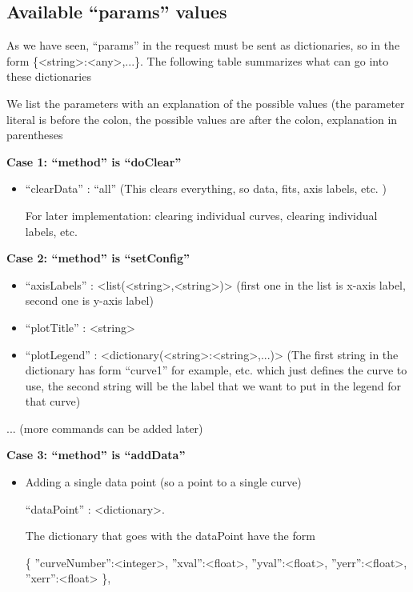 \documentclass[11pt]{article} %
\begin{document}
\subsection{Available ``params'' values}

As we have seen, ``params'' in the request must be sent as dictionaries, so in the form \{<string>:<any>,...\}. The following table summarizes what can go into these dictionaries

\begin{tcolorbox}[breakable,title=Sending ``params'' to the server]

We list the parameters with an explanation of the possible values (the parameter literal is before the colon, the possible values are after the colon, explanation in parentheses

\textbf{Case 1: ``method'' is ``doClear''}
\begin{itemize}
\item ``clearData'' : ``all'' (This clears everything, so data, fits, axis labels, etc. )

For later implementation: clearing individual curves, clearing individual labels, etc.
\end{itemize}
\textbf{Case 2: ``method'' is ``setConfig''}
\begin{itemize}
\item ``axisLabels'' : <list(<string>,<string>)> (first one in the list is x-axis label, second one is y-axis label)
\item ``plotTitle'' : <string>
\item ``plotLegend'' : <dictionary(<string>:<string>,...)> (The first string in the dictionary has form ``curve1'' for example, etc. which just defines the curve to use, the second string will be the label that we want to put in the legend for that curve)
\end{itemize}
	... (more commands can be added later)

\textbf{Case 3: ``method'' is ``addData''}
\begin{itemize}
\item Adding a single data point (so a point to a single curve)

``dataPoint'' : <dictionary>. 

The dictionary that goes with the dataPoint have the form

{ \{ {''}curveNumber{''}:<integer>, {''}xval{''}:<float>, {''}yval{''}:<float>, {''}yerr{''}:<float>, {''}xerr{''}:<float> \}}, 


\end{itemize}
\end{tcolorbox}
\end{document}
